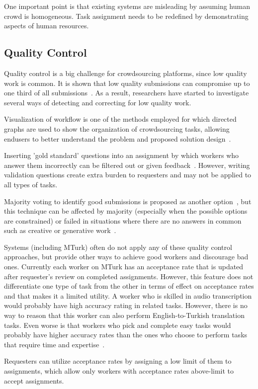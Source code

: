 One important point is that existing systems are misleading by assuming 
human crowd is homogeneous. Task assignment needs to be redefined 
by demonstrating aspects of human resources.

\subsection{Quality Control}
Quality control is a big challenge for crowdsourcing platforms, since low quality work 
is common. It is shown that low quality submissions can compromise up to one third 
of all submissions~\cite{Bernstein2010}. As a result, researchers have started to 
investigate several ways of detecting and correcting for low quality work.

Visualization of workflow is one of the methods employed for which directed graphs 
are used to show the organization of crowdsourcing tasks, allowing endusers 
to better understand the problem and proposed solution design~\cite{Kulkarni2012, Kittur2012}.

Inserting 'gold standard' questions into an assignment by which workers 
who answer them incorrectly can be filtered out or given feedback~\cite{Burch2009}. 
However, writing validation questions create extra burden to requesters and 
may not be applied to all types of tasks.

Majority voting to identify good submissions is proposed as another 
option~\cite{Burch2009, Bernstein2010}, but this technique can be affected 
by majority (especially when the possible options are constrained) or failed in 
situations where there are no answers in common such as creative or generative 
work~\cite{Rzeszotarski2012}.

Systems (including MTurk) often do not apply any of these quality control approaches, 
but provide other ways to achieve good workers and discourage bad ones. 
Currently each worker on MTurk has an acceptance rate that is updated after 
requester's review on completed assignments. However, this feature does not 
differentiate one type of task from the other in terms of effect on acceptance rates 
and that makes it a limited utility. A worker who is skilled in audio transcription would 
probably have high accuracy rating in related tasks. However, there is no way to 
reason that this worker can also perform English-to-Turkish translation tasks. 
Even worse is that workers who pick and complete easy tasks would probably 
have higher accuracy rates than the ones who choose to perform tasks that 
require time and expertise~\cite{Barowy2012}.

Requesters can utilize acceptance rates by assigning a low limit of them to 
assignments, which allow only workers with acceptance rates above-limit 
to accept assignments.
